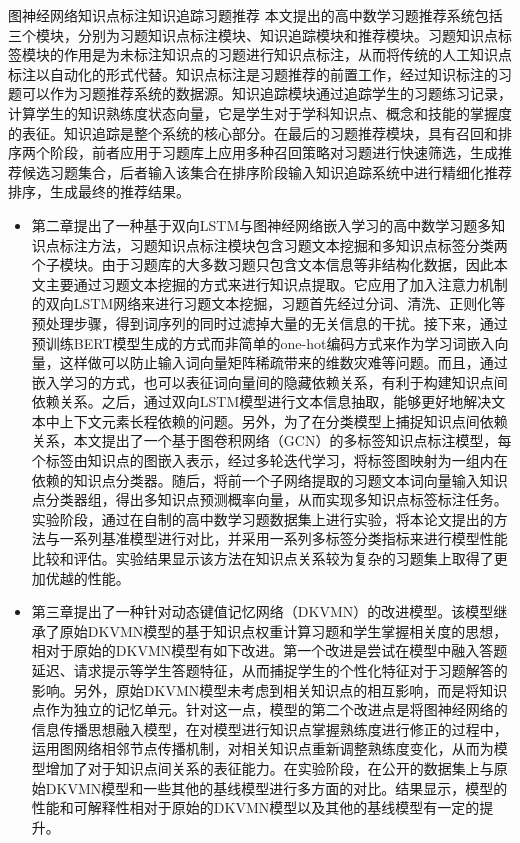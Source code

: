 \begin{abstractC}{图神经网络}{知识点标注}{知识追踪}{习题推荐}{}
	本文提出的高中数学习题推荐系统包括三个模块，分别为习题知识点标注模块、知识追踪模块和推荐模块。习题知识点标签模块的作用是为未标注知识点的习题进行知识点标注，从而将传统的人工知识点标注以自动化的形式代替。知识点标注是习题推荐的前置工作，经过知识标注的习题可以作为习题推荐系统的数据源。知识追踪模块通过追踪学生的习题练习记录，计算学生的知识熟练度状态向量，它是学生对于学科知识点、概念和技能的掌握度的表征。知识追踪是整个系统的核心部分。在最后的习题推荐模块，具有召回和排序两个阶段，前者应用于习题库上应用多种召回策略对习题进行快速筛选，生成推荐候选习题集合，后者输入该集合在排序阶段输入知识追踪系统中进行精细化推荐排序，生成最终的推荐结果。
	\begin{itemize}
		\item 第二章提出了一种基于双向LSTM与图神经网络嵌入学习的高中数学习题多知识点标注方法，习题知识点标注模块包含习题文本挖掘和多知识点标签分类两个子模块。由于习题库的大多数习题只包含文本信息等非结构化数据，因此本文主要通过习题文本挖掘的方式来进行知识点提取。它应用了加入注意力机制的双向LSTM网络来进行习题文本挖掘，习题首先经过分词、清洗、正则化等预处理步骤，得到词序列的同时过滤掉大量的无关信息的干扰。接下来，通过预训练BERT模型生成的方式而非简单的one-hot编码方式来作为学习词嵌入向量，这样做可以防止输入词向量矩阵稀疏带来的维数灾难等问题。而且，通过嵌入学习的方式，也可以表征词向量间的隐藏依赖关系，有利于构建知识点间依赖关系。之后，通过双向LSTM模型进行文本信息抽取，能够更好地解决文本中上下文元素长程依赖的问题。另外，为了在分类模型上捕捉知识点间依赖关系，本文提出了一个基于图卷积网络（GCN）的多标签知识点标注模型，每个标签由知识点的图嵌入表示，经过多轮迭代学习，将标签图映射为一组内在依赖的知识点分类器。随后，将前一个子网络提取的习题文本词向量输入知识点分类器组，得出多知识点预测概率向量，从而实现多知识点标签标注任务。实验阶段，通过在自制的高中数学习题数据集上进行实验，将本论文提出的方法与一系列基准模型进行对比，并采用一系列多标签分类指标来进行模型性能比较和评估。实验结果显示该方法在知识点关系较为复杂的习题集上取得了更加优越的性能。
		\item 第三章提出了一种针对动态键值记忆网络（DKVMN）的改进模型。该模型继承了原始DKVMN模型的基于知识点权重计算习题和学生掌握相关度的思想，相对于原始的DKVMN模型有如下改进。第一个改进是尝试在模型中融入答题延迟、请求提示等学生答题特征，从而捕捉学生的个性化特征对于习题解答的影响。另外，原始DKVMN模型未考虑到相关知识点的相互影响，而是将知识点作为独立的记忆单元。针对这一点，模型的第二个改进点是将图神经网络的信息传播思想融入模型，在对模型进行知识点掌握熟练度进行修正的过程中，运用图网络相邻节点传播机制，对相关知识点重新调整熟练度变化，从而为模型增加了对于知识点间关系的表征能力。在实验阶段，在公开的数据集上与原始DKVMN模型和一些其他的基线模型进行多方面的对比。结果显示，模型的性能和可解释性相对于原始的DKVMN模型以及其他的基线模型有一定的提升。

\end{itemize}
\end{abstractC}
